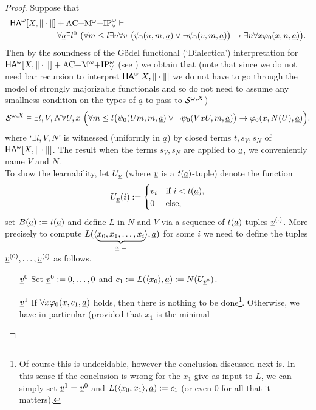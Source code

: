 \begin{proof}
Suppose that 
\[ \ba{l} 
\ha[X,\|\cdot\|]+\mbox{AC$+$M$^{\omega}+$IP}^{\omega}_{\forall} 
\vdash \\[1mm] \hspace*{2cm} 
\forall \underline{a}\exists l^0\ \big( 
\forall m\leq l \exists u \forall v\ \big(\psi_0(u,m,\tup a) \vee \neg\psi_0(v,m,\tup a)\big)\rightarrow \exists n \forall x \phi_0(x,n,\tup a)\big).
\ea \]
Then by the soundness of the G\"odel functional (`Dialectica') 
interpretation for $\ha[X,\|\cdot\|]+\mbox{AC$+$M$^{\omega}+$IP}^{\omega}_{\forall}$ (see \cite{Kohlenbach08}) we obtain that (note that since we do not need 
bar recursion to interpret $\ha[X,\|\cdot\|]$ we do not have to go through 
the model of strongly majorizable functionals and so do not need to assume 
any smallness condition on the types of $\underline{a}$ to pass to 
${\cal S}^{\omega,X}$)   
\[ {\cal S}^{\omega,X} \models \exists l,V,N \forall U,x\ \Big(\forall m\leq l 
\big (\psi_0(Um,m,\tup a) \vee \neg\psi_0(VxU,m,\tup a)\big)
\rightarrow \phi_0(x,N(U),\tup a)\Big).
\]
where `$\exists l,V,N$' is witnessed (uniformly in $\underline{a}$) 
by closed terms $t,s_V,s_N$ of 
$\ha[X,\|\cdot\|]$. 
The result when the terms $s_V,s_N$ are applied to 
$\tup a$, we conveniently name $V$ and $N$.\\
To show the learnability, let $U_{\tup v}$ (where $\tup v$ is a $t(\tup a)$-tuple) denote the function \[
U_{\tup v}(i):=\begin{cases}
v_i&\Tif\ i<t(\tup a),\\
0&\Telse,
\end{cases}\] set $B(\tup a):=t(\tup a)$ and define $L$ in $N$ and $V$ via a sequence of $t(\tup a)$-tuples $\tup v^{(\cdot)}$.
More precisely to compute $L(\langle \underbrace {x_0,x_1,\ldots,x_i}_{\tup x:=}\rangle,\tup a)$ for some $i$ we need to
define the tuples $\tup v^{(0)},\ldots,\tup v^{(i)}$ as follows.
\begin{enumerate}
\item[$\tup v^0$] 
Set $\tup v^0:=0,\ldots,0$ and $c_1:=L(\langle x_0\rangle,\tup a):=
N(U_{\tup v^0})$.
\item[$\tup v^1$] If $\forall x \phi_0(x,c_1,\tup a)$ holds, then there is nothing to be 
done\footnote{
Of course this is undecidable, however the conclusion discussed next is. In this sense if the conclusion is wrong for the $x_1$ give as input to $L$, 
we can simply set $\tup v^1=\tup v^0$ and $L(\langle x_0,x_1\rangle,\tup a):=c_1$ (or even $0$ for all that it matters).
}. 
Otherwise, we have in particular (provided that $x_1$ is the minimal 

\end{enumerate}
\end{proof}

